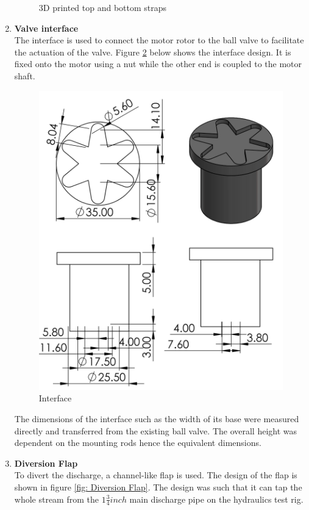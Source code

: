 \begin{enumerate}
\begin{figure}[H]
    \caption{3D printed top and bottom straps}
    \label{fig: 3D printed top and bottom straps}
\end{figure}
\item \textbf{Valve interface}\\
The interface is used to connect the motor rotor to the ball valve to facilitate the actuation of the valve. Figure \ref{fig: Interface} below shows the interface design. It is fixed onto the motor using a nut while the other end is coupled to the motor shaft.
\begin{figure}[H]
\centering
\includegraphics [width=.8\textwidth, height=.6\textheight]{Figures/interface.PNG}
\caption{Interface}
\label{fig: Interface}
\end{figure}
The dimensions of the interface such as the width of its base were measured directly and transferred from the existing ball valve. The overall height was dependent on the mounting rods hence the equivalent dimensions. 
\item \textbf{Diversion Flap}\\
To divert the discharge, a channel-like flap is used. The design of the flap is shown in figure \ref{fig: Diversion Flap}. The design was such that it can tap the whole stream from the $1\frac{3}{4} inch$ main discharge pipe on the hydraulics test rig. 
\begin{figure}[H]

\end{figure}
\end{enumerate}
